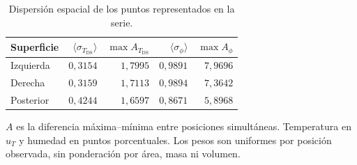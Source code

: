 \begin{table}[htbp]
\centering
\caption{Dispersión espacial de los puntos representados en la serie.}
\label{tab:res_uniformidad}
\small
\setlength{\tabcolsep}{5pt}
\begin{tabular}{lrrrr}
\toprule
Superficie & $\langle\sigma_{T_{\mathrm{DS}}}\rangle$ & $\max A_{T_{\mathrm{DS}}}$ & $\langle\sigma_{\phi}\rangle$ & $\max A_\phi$ \\
\midrule
Izquierda & $0{,}3154$ & $1{,}7995$ & $0{,}9891$ & $7{,}9696$ \\
Derecha & $0{,}3159$ & $1{,}7113$ & $0{,}9894$ & $7{,}3642$ \\
Posterior & $0{,}4244$ & $1{,}6597$ & $0{,}8671$ & $5{,}8968$ \\
\bottomrule
\end{tabular}
\par\vspace{3pt}
\begin{minipage}{0.98\textwidth}\footnotesize
$A$ es la diferencia máxima--mínima entre posiciones simultáneas. Temperatura en $u_T$ y humedad en puntos porcentuales. Los pesos son uniformes por posición observada, sin ponderación por área, masa ni volumen.
\end{minipage}
\end{table}
